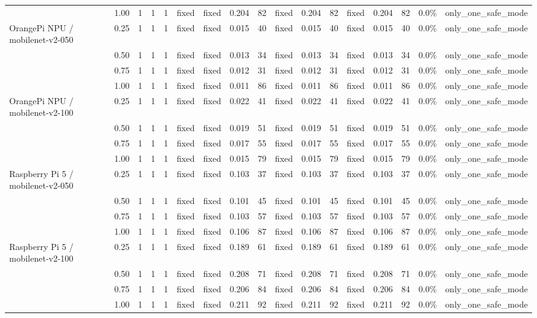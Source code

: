 \documentclass[10pt]{article}
\begin{document}
\begin{center}
\begin{longtable}{@{}l l r r r l l r r l r r l r r r l@{}}
 & 1.00 & 1 & 1 & 1 & fixed & fixed & 0.204 & 82 & fixed & 0.204 & 82 & fixed & 0.204 & 82 & 0.0\% & only\_one\_safe\_mode \\
\addlinespace[2pt]
OrangePi NPU / mobilenet-v2-050 & 0.25 & 1 & 1 & 1 & fixed & fixed & 0.015 & 40 & fixed & 0.015 & 40 & fixed & 0.015 & 40 & 0.0\% & only\_one\_safe\_mode \\
 & 0.50 & 1 & 1 & 1 & fixed & fixed & 0.013 & 34 & fixed & 0.013 & 34 & fixed & 0.013 & 34 & 0.0\% & only\_one\_safe\_mode \\
 & 0.75 & 1 & 1 & 1 & fixed & fixed & 0.012 & 31 & fixed & 0.012 & 31 & fixed & 0.012 & 31 & 0.0\% & only\_one\_safe\_mode \\
 & 1.00 & 1 & 1 & 1 & fixed & fixed & 0.011 & 86 & fixed & 0.011 & 86 & fixed & 0.011 & 86 & 0.0\% & only\_one\_safe\_mode \\
\addlinespace[2pt]
OrangePi NPU / mobilenet-v2-100 & 0.25 & 1 & 1 & 1 & fixed & fixed & 0.022 & 41 & fixed & 0.022 & 41 & fixed & 0.022 & 41 & 0.0\% & only\_one\_safe\_mode \\
 & 0.50 & 1 & 1 & 1 & fixed & fixed & 0.019 & 51 & fixed & 0.019 & 51 & fixed & 0.019 & 51 & 0.0\% & only\_one\_safe\_mode \\
 & 0.75 & 1 & 1 & 1 & fixed & fixed & 0.017 & 55 & fixed & 0.017 & 55 & fixed & 0.017 & 55 & 0.0\% & only\_one\_safe\_mode \\
 & 1.00 & 1 & 1 & 1 & fixed & fixed & 0.015 & 79 & fixed & 0.015 & 79 & fixed & 0.015 & 79 & 0.0\% & only\_one\_safe\_mode \\
\addlinespace[2pt]
Raspberry Pi 5 / mobilenet-v2-050 & 0.25 & 1 & 1 & 1 & fixed & fixed & 0.103 & 37 & fixed & 0.103 & 37 & fixed & 0.103 & 37 & 0.0\% & only\_one\_safe\_mode \\
 & 0.50 & 1 & 1 & 1 & fixed & fixed & 0.101 & 45 & fixed & 0.101 & 45 & fixed & 0.101 & 45 & 0.0\% & only\_one\_safe\_mode \\
 & 0.75 & 1 & 1 & 1 & fixed & fixed & 0.103 & 57 & fixed & 0.103 & 57 & fixed & 0.103 & 57 & 0.0\% & only\_one\_safe\_mode \\
 & 1.00 & 1 & 1 & 1 & fixed & fixed & 0.106 & 87 & fixed & 0.106 & 87 & fixed & 0.106 & 87 & 0.0\% & only\_one\_safe\_mode \\
\addlinespace[2pt]
Raspberry Pi 5 / mobilenet-v2-100 & 0.25 & 1 & 1 & 1 & fixed & fixed & 0.189 & 61 & fixed & 0.189 & 61 & fixed & 0.189 & 61 & 0.0\% & only\_one\_safe\_mode \\
 & 0.50 & 1 & 1 & 1 & fixed & fixed & 0.208 & 71 & fixed & 0.208 & 71 & fixed & 0.208 & 71 & 0.0\% & only\_one\_safe\_mode \\
 & 0.75 & 1 & 1 & 1 & fixed & fixed & 0.206 & 84 & fixed & 0.206 & 84 & fixed & 0.206 & 84 & 0.0\% & only\_one\_safe\_mode \\
 & 1.00 & 1 & 1 & 1 & fixed & fixed & 0.211 & 92 & fixed & 0.211 & 92 & fixed & 0.211 & 92 & 0.0\% & only\_one\_safe\_mode \\
\bottomrule
\end{longtable}\end{center}
\end{document}
